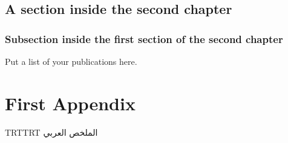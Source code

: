 \documentclass[
12pt,
oneside, 
onehalfspacing, 
nolistspacing, 
parskip, 
chapterinoneline, 
]{AASTCOMPUTER}
\newenvironment{Arabic}    
    {\textdir TRT\pardir TRT\arabicfont}{}
\begin{document}
\section{A section inside the second chapter}
\lipsum[8]

\subsection{Subsection inside the first section of the second chapter}
\lipsum[9-11]

\listreferences

\begin{listofpublicationsp}
Put a list of your publications here.
\end{listofpublicationsp}


\appendixstart 
\chapter{First Appendix}

\begin{arabicabstractp}
\begin{Arabic}
الملخص العربي
\end{Arabic}
\end{arabicabstractp}

\arabicexaminersp

\arabictitlep
\end{document}
